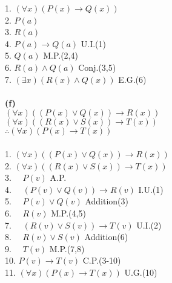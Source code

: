\documentclass{article}
\begin{document}
1. $(\forall x)(P(x) \rightarrow Q(x))$ \\
2. $P(a)$  \\
3. $R(a)$ \\
4. $P(a) \rightarrow Q(a)$ \hspace*{\fill} U.I.(1) \\
5. $Q(a)$ \hspace*{\fill} M.P.(2,4) \\
6. $R(a) \wedge Q(a)$ \hspace*{\fill} Conj.(3,5) \\
7. $(\exists x)(R(x) \wedge Q(x))$ \hspace*{\fill} E.G.(6) \\ \\
\textbf{(f)} \\
$(\forall x)((P(x) \vee Q(x)) \rightarrow R(x))$ \\
\underline{$(\forall x)((R(x) \vee S(x)) \rightarrow T(x))$} \\
$\therefore (\forall x)(P(x) \rightarrow T(x))$ \\ \\
1. $(\forall x)((P(x) \vee Q(x)) \rightarrow R(x))$ \\
2. $(\forall x)((R(x) \vee S(x)) \rightarrow T(x))$ \\
3. $ \quad P(v)$ \hspace*{\fill} A.P. \\
4. $\quad (P(v) \vee Q(v)) \rightarrow R(v)$ \hspace*{\fill} I.U.(1) \\
5. $\quad P(v) \vee Q(v)$ \hspace*{\fill} Addition(3) \\
6. $\quad R(v)$ \hspace*{\fill} M.P.(4,5) \\
7. $\quad (R(v) \vee S(v)) \rightarrow T(v)$ \hspace*{\fill} U.I.(2) \\
8. $\quad R(v) \vee S(v)$ \hspace*{\fill} Addition(6) \\
9. $\quad T(v)$ \hspace*{\fill} M.P.(7,8) \\
10. $P(v) \rightarrow T(v)$ \hspace*{\fill} C.P.(3-10) \\
11. $(\forall x)(P(x) \rightarrow T(x))$ \hspace*{\fill} U.G.(10) \\
\end{document}
